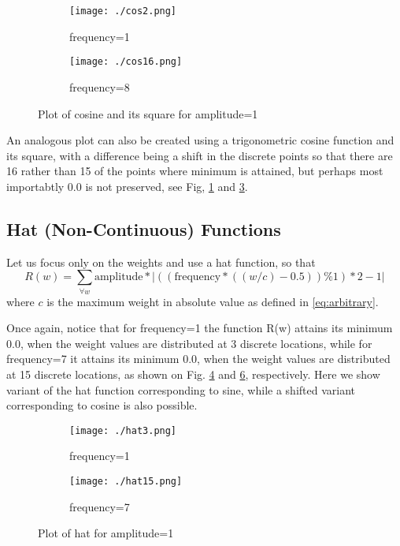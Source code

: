 \documentclass{article}
\newcommand{\squeeze}{\vspace{-2.5mm}}
\begin{document}
\begin{figure}[h]
 \begin{center}
  \begin{subfigure}[b]{0.49\textwidth}
   \texttt{[image: ./cos2.png]}
   \caption{frequency=1}
   \label{fig:cos2}
  \end{subfigure}
  \begin{subfigure}[b]{0.49\textwidth}
   \texttt{[image: ./cos16.png]}
   \caption{frequency=8}
   \label{fig:cos16}
  \end{subfigure}
  \caption{Plot of cosine and its square for amplitude=1}
  \squeeze \squeeze
 \end{center}
\end{figure}

\clearpage
\newpage

An analogous plot can also be created using a trigonometric cosine function and its square, with a difference being a shift in the discrete points so that there are 16 rather than 15 of the points where minimum is attained, but perhaps most importabtly $0.0$ is not preserved, see Fig, \ref{fig:cos2} and \ref{fig:cos16}.


\subsection{Hat (Non-Continuous) Functions}

Let us focus only on the weights and use a hat function, so that
\begin{equation}
R(w) = \sum_{\forall w} \text{amplitude} * |((\text{frequency} * ((w/c)-0.5)) \% 1)*2 - 1|
\label{eq:hat_non}
\end{equation}
where $c$ is the maximum weight in absolute value as defined in \eqref{eq:arbitrary}.

Once again, notice that for frequency=1 the function R(w) attains its minimum 0.0, when the weight values are distributed at 3 discrete locations, while for frequency=7 it attains its minimum 0.0, when the weight values are distributed at 15 discrete locations, as shown on Fig. \ref{fig:hat3} and \ref{fig:hat15}, respectively. Here we show variant of the hat function corresponding to sine, while a shifted variant corresponding to cosine is also possible.

\begin{figure}[h]
 \begin{center}
  \begin{subfigure}[b]{0.49\textwidth}
    \texttt{[image: ./hat3.png]}
    \caption{frequency=1}
    \label{fig:hat3}
  \end{subfigure}
  \begin{subfigure}[b]{0.49\textwidth}
    \texttt{[image: ./hat15.png]}
    \caption{frequency=7}
    \label{fig:hat15}
  \end{subfigure}
  \caption{Plot of hat for amplitude=1}
  \squeeze \squeeze
 \end{center}
\end{figure}
\end{document}
